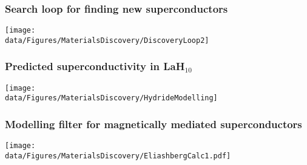 \begin{emptyframe}
    \frametitle{Search loop for finding new superconductors}
    \centerline{\texttt{[image: \\data/Figures/MaterialsDiscovery/DiscoveryLoop2]}}
\end{emptyframe}

\begin{emptyframe}
    \frametitle{Predicted superconductivity in LaH$_{10}$}
    \centerline{\texttt{[image: \\data/Figures/MaterialsDiscovery/HydrideModelling]}}
\end{emptyframe}

\begin{emptyframe}
  \frametitle{Modelling filter for magnetically mediated superconductors}
  \centerline{\texttt{[image: \\data/Figures/MaterialsDiscovery/EliashbergCalc1.pdf]}}  
\end{emptyframe}
{}

